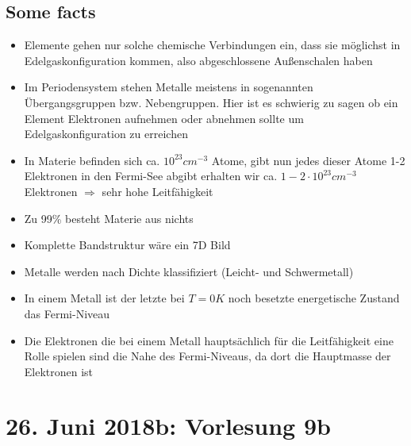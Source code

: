 \documentclass[12pt,a4paper]{report}%
\numberwithin{equation}{section}
\numberwithin{equation}{subsection}
\begin{document}
		\subsection{Some facts}
			\begin{itemize}
			  \item Elemente gehen nur solche chemische Verbindungen ein, dass sie möglichst in Edelgaskonfiguration kommen, also abgeschlossene Außenschalen haben
			  \item Im Periodensystem stehen Metalle meistens in sogenannten Übergangsgruppen bzw. Nebengruppen. Hier ist es schwierig zu sagen ob ein Element Elektronen aufnehmen oder abnehmen sollte um Edelgaskonfiguration zu erreichen
			  \item In Materie befinden sich ca. $10^{23} cm^{-3}$ Atome, gibt nun jedes dieser Atome 1-2 Elektronen in den Fermi-See abgibt erhalten wir ca. $1-2 \cdot 10^{23} cm^{-3}$ Elektronen $\Rightarrow$ sehr hohe Leitfähigkeit
			  \item Zu 99\% besteht Materie aus nichts
			  \item Komplette Bandstruktur wäre ein 7D Bild
			  \item Metalle werden nach Dichte klassifiziert (Leicht- und Schwermetall)
			  \item In einem Metall ist der letzte bei $T = 0K$ noch besetzte energetische Zustand das Fermi-Niveau
			  \item Die Elektronen die bei einem Metall hauptsächlich für die Leitfähigkeit eine Rolle spielen sind die Nahe des Fermi-Niveaus, da dort die Hauptmasse der Elektronen ist
			\end{itemize}
\newpage

	\section{26. Juni 2018b: Vorlesung 9b}
\end{document}
